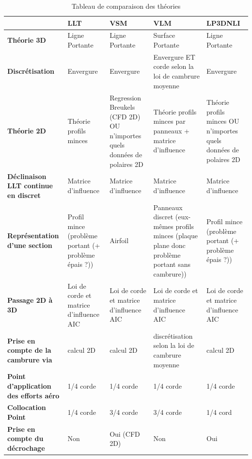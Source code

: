 \begin{table}[h!]
    \centering
    \begin{tabular}{|p{2.8cm}|p{1.6cm}|p{2cm}|p{3cm}|p{2cm}|}
        \hline
        & \textbf{LLT} & \textbf{VSM} & \textbf{VLM} & \textbf{LP3DNLI} \\ \hline
        \textbf{Théorie 3D} & Ligne Portante & Ligne Portante & Surface Portante & Ligne Portante\\ \hline
        \textbf{Discrétisation} & Envergure & Envergure & Envergure ET corde selon la loi de cambrure moyenne & Envergure \\ \hline
        \textbf{Théorie 2D} & Théorie profils minces & Regression Breukels (CFD 2D) OU n'importes quels données de polaires 2D & Théorie profils minces par panneaux + matrice d'influence & Théorie profils minces OU n'importes quels données de polaires 2D \\ \hline
        \textbf{Déclinaison LLT continue en discret} & Matrice d'influence & Matrice d'influence & Matrice d'influence & Matrice d'influence\\ \hline
        \textbf{Représentation d'une section} & Profil mince (problème portant (+ problème épais ?)) & Airfoil & Panneaux discret (eux-mêmes profils minces (plaque plane donc problème portant sans cambrure)) & Profil mince (problème portant (+ problème épais ?)) \\ \hline
        \textbf{Passage 2D à 3D} & Loi de corde et matrice d'influence AIC & Loi de corde et matrice d'influence AIC & Loi de corde et matrice d'influence AIC & Loi de corde et matrice d'influence AIC\\ \hline
        \textbf{Prise en compte de la cambrure via} & calcul 2D & calcul 2D & discrétisation selon la loi de cambrure moyenne & calcul 2D\\ \hline
        \textbf{Point d'application des efforts aéro} & 1/4 corde & 1/4 corde & 1/4 corde & 1/4 corde\\ \hline
        \textbf{Collocation Point} & 1/4 corde & 3/4 corde & 3/4 corde & 1/4 cord \\ \hline
        \textbf{Prise en compte du décrochage} & Non & Oui (CFD 2D) & Non & Oui \\ \hline
    \end{tabular}
    \caption{Tableau de comparaison des théories}
    \label{tab:comparaison}
\end{table}